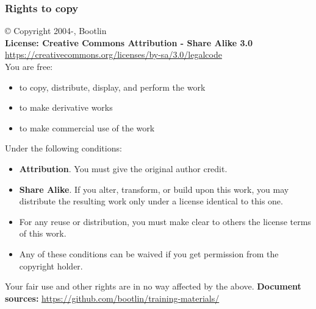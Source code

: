 \ifdefempty{\trainer}{}{
  
}

\begin{frame}
\frametitle{Rights to copy}
   \scriptsize
   © Copyright 2004-\the\year, Bootlin \\
   {\bf License: Creative Commons Attribution - Share Alike 3.0} \\
   \url{https://creativecommons.org/licenses/by-sa/3.0/legalcode} \\

   You are free:
   \begin{itemize}
     \item to copy, distribute, display, and perform the work
     \item to make derivative works
     \item to make commercial use of the work
   \end{itemize}

   Under the following conditions:
   \begin{itemize}
     \item {\bf Attribution}. You must give the original author credit.
     \item {\bf Share Alike}. If you alter, transform, or build upon
           this work, you may distribute the resulting work only under
           a license identical to this one.
     \item For any reuse or distribution, you must make clear to others
           the license terms of this work.
     \item Any of these conditions can be waived if you get permission
           from the copyright holder.
    \end{itemize}

    Your fair use and other rights are in no way affected by the above.
    \vfill
    {\bf Document sources:}
    \url{https://github.com/bootlin/training-materials/} \\
\end{frame}


